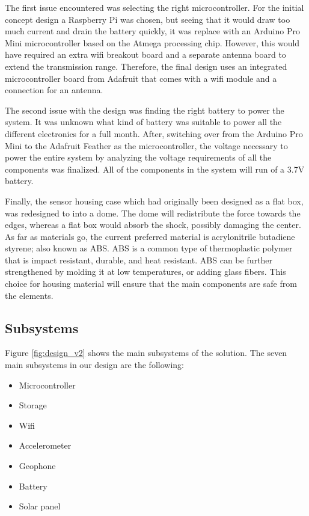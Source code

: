 \documentclass[12pt]{article}
\begin{document}
The first issue encountered was selecting the right microcontroller. For the initial concept design a Raspberry Pi was chosen, but seeing that it would draw too much current and drain the battery quickly, it was replace with an Arduino Pro Mini microcontroller based on the Atmega processing chip. However, this would have required an extra wifi breakout board and a separate antenna board to extend the transmission range. Therefore, the final design uses an integrated microcontroller board from Adafruit that comes with a wifi module and a connection for an antenna.

The second issue with the design was finding the right battery to power the system. It was unknown what kind of battery was suitable to power all the different electronics for a full month. After, switching over from the Arduino Pro Mini to the Adafruit Feather as the microcontroller, the voltage necessary to power the entire system by analyzing the voltage requirements of all the components was finalized. All of the components in the system will run of a 3.7V battery.

Finally, the sensor housing case which had originally been designed as a flat box, was redesigned to into a dome. The dome will redistribute the force towards the edges, whereas a flat box would absorb the shock, possibly damaging the center. As far as materials go, the current preferred material is acrylonitrile butadiene styrene; also known as ABS. ABS is a common type of thermoplastic polymer that is impact resistant, durable, and heat resistant. ABS can be further strengthened by molding it at low temperatures, or adding glass fibers. This choice for housing material will ensure that the main components are safe from the elements.

\subsection{Subsystems}
Figure \ref{fig:design_v2} shows the main subsystems of the solution. The seven main subsystems in our design are the following:
\begin{itemize}
	\item Microcontroller
	\item Storage
	\item Wifi
	\item Accelerometer
	\item Geophone
	\item Battery
	\item Solar panel
\end{itemize}
\end{document}

